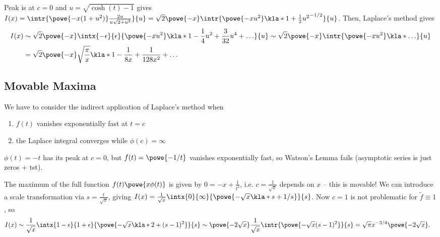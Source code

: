 \documentclass[english, parskip=full]{scrbook}
\newcommand{\example}[3]{\begin{tcolorbox}[colback=colorbackgroundexample,colframe=colorexample, breakable,enhanced,title={\textbf{#1}: #2.}]#3\end{tcolorbox}}
\begin{document}
\example{Exponential hyperbolic integral}{$I(x) = \intr{\powe{-x\cosh(t)}}{t}$ as $x\rightarrow\infty$}{Peak is at $c=0$ and $u = \sqrt{\cosh(t)-1}$ gives $I(x) = \intr{\powe{-x(1+u^2)} \frac{2u}{u\sqrt{2+u^2}}}{u} = \sqrt{2} \powe{-x} \intr{\powe{-xu^2} \kla*{1 + \frac{1}{2}u^2}^{-1/2}}{u}$.
Then, Laplace's method gives
\begin{align}
I(x) &\sim \sqrt{2}\powe{-x} \intx{-\epsilon}{\epsilon}{\powe{-xu^2} \kla*{1 - \frac{1}{4}u^2 + \frac{3}{32} u^4 + \dots}}{u} \sim \sqrt{2}\powe{-x} \intr{\powe{-xu^2} \kla*{\dots}}{u}\\
&= \sqrt{2}\powe{-x} \sqrt{\frac{\pi}{x}} \kla*{1 - \frac{1}{8x} + \frac{1}{128x^2} + \dots}
\end{align}
}
\subsection{Movable Maxima}
We have to consider the indirect application of Laplace's method when
\begin{enumerate}
\item $f(t)$ vanishes exponentially fast at $t=c$
\item the Laplace integral converges while $\phi(c)=\infty$
\end{enumerate}
\example{Watson falls short}{$I(x) = \intx{0}{\infty}{\powe{-xt - 1/t}}{t}$ as $x\rightarrow\infty$}{$\phi(t)=-t$ has its peak at $c=0$, but $f(t)=\powe{-1/t}$ vanishes exponentially fast, so Watson's Lemma fails (asymptotic series is just zeros + \gls{tst}).

The maximum of the full function $f(t)\powe{x\phi(t)}$ is given by $0=-x+\frac{1}{t^2}$, i.e. $c=\frac{1}{\sqrt{x}}$ depends on $x$ -- this is movable!
We can introduce a scale transformation via $s=\frac{t}{\sqrt{x}}$, giving $I(x) = \frac{1}{\sqrt{x}} \intx{0}{\infty}{\powe{-\sqrt{x} \kla*{s + 1/s}}}{s}$.
Now $c=1$ is not problematic for $\tilde{f}\equiv 1$, so
\begin{align}
I(x) &\sim \frac{1}{\sqrt{x}} \intx{1-\epsilon}{1+\epsilon}{\powe{-\sqrt{x}\kla*{2 + (s-1)^2}}}{s} \sim \powe{-2\sqrt{x}} \frac{1}{\sqrt{x}} \intr{\powe{-\sqrt{x} (s-1)^2}}{s} = \sqrt{\pi} x^{-3/4} \powe{-2\sqrt{x}}.
\end{align}
}
\end{document}
